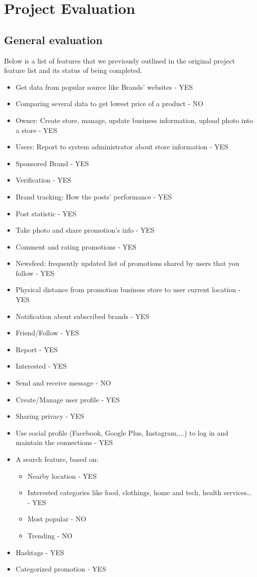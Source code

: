 \chapter{Project Evaluation}
\section{General evaluation}
Below is a list of features that we previously outlined in the original project feature list \cite{featurelist} and its status of being completed.
\begin{itemize}
\item{Get data from popular source like Brands’ websites - YES}
\item{Comparing several data to get lowest price of a product - NO}

\item{Owner: Create store, manage, update business information, upload photo into a store - YES}
\item{Users: Report to system administrator about store information - YES}
\item{Sponsored Brand - YES}
\item{Verification - YES}
\item{Brand tracking: How the posts’ performance - YES}
\item{Post statistic - YES}

\item{Take photo and share promotion’s info - YES}
\item{Comment and rating promotions - YES}
\item{Newsfeed: frequently updated list of promotions shared by users that you follow - YES}
\item{Physical distance from promotion business store to user current location - YES}
\item{Notification about subscribed brands - YES}
\item{Friend/Follow - YES}
\item{Report - YES}
\item{Interested - YES}
\item{Send and receive message - NO}
\item{Create/Manage user profile - YES}
\item{Sharing privacy - YES}
\item{Use social profile (Facebook, Google Plus, Instagram,...) to log in and maintain the connections - YES}

\item{A search feature, based on:}
\begin{itemize}
\item{Nearby location - YES}
\item{Interested categories like food, clothings, home and tech, health services… - YES}
\item{Most popular - NO}
\item{Trending - NO}
\end{itemize}
\item{Hashtags - YES}
\item{Categorized promotion - YES}
\end{itemize}

